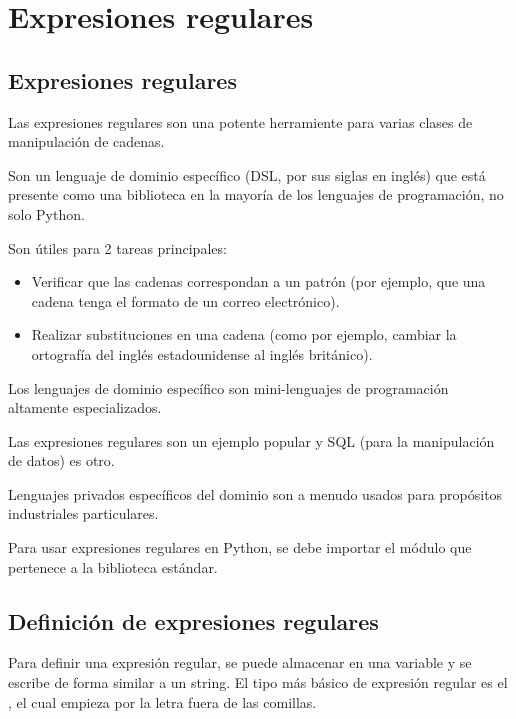 \chapter{Expresiones regulares}

\section{Expresiones regulares}

Las expresiones regulares son una potente herramiente para varias clases de manipulación de cadenas.\smallskip

Son un lenguaje de dominio específico (DSL, por sus siglas en inglés) que está presente como una biblioteca en la mayoría de los lenguajes de programación, no solo Python.\smallskip

Son útiles para 2 tareas principales:

\begin{itemize}
    \item Verificar que las cadenas correspondan a un patrón (por ejemplo, que una cadena tenga el formato de un correo electrónico).
    
    \item Realizar substituciones en una cadena (como por ejemplo, cambiar la ortografía del inglés estadounidense al inglés británico).
    
\end{itemize}

Los lenguajes de dominio específico son mini-lenguajes de programación altamente especializados.\smallskip

Las expresiones regulares son un ejemplo popular y SQL (para la manipulación de datos) es otro.\smallskip

Lenguajes privados específicos del dominio son a menudo usados para propósitos industriales particulares.\smallskip

Para usar expresiones regulares en Python, se debe importar el módulo  que pertenece a la biblioteca estándar.


\section{Definición de expresiones regulares}

Para definir una expresión regular, se puede almacenar en una variable y se escribe de forma similar a un string. El tipo más básico de expresión regular es el , el cual empieza por la letra  fuera de las comillas.

